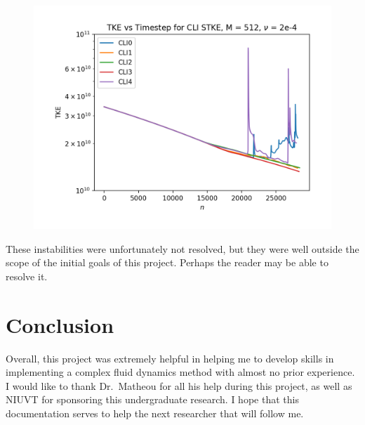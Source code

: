 \documentclass[12pt, reqno]{amsart}
\begin{document}
\begin{figure}[H]
    \centering
    \includegraphics[width = 1\linewidth]{TKE Plot, 512.png}
\end{figure}
These instabilities were unfortunately not resolved, but they were well outside the scope of the initial goals of this project. Perhaps the reader may be able to resolve it.

\section{Conclusion}
Overall, this project was extremely helpful in helping me to develop skills in implementing a complex fluid dynamics method with almost no prior experience. I would like to thank Dr.\ Matheou for all his help during this project, as well as NIUVT for sponsoring this undergraduate research. I hope that this documentation serves to help the next researcher that will follow me.
\end{document}
